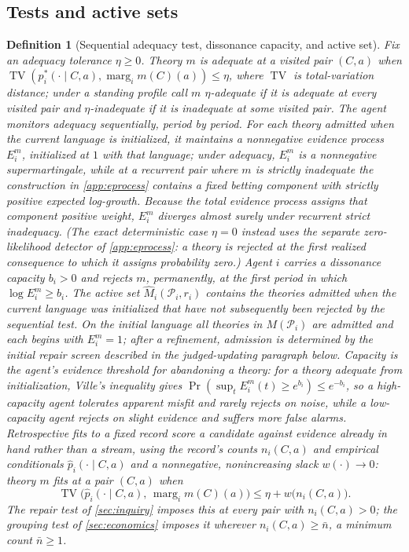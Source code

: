 \documentclass[11pt]{article}
\newtheorem{definition}[assumption]{Definition}
\theoremstyle{definition}
\newcommand{\TV}{\operatorname{TV}}
\newcommand{\marg}[1]{\operatorname{marg}_{#1}}
\begin{document}
\subsection{Tests and active sets}

\begin{definition}[Sequential adequacy test, dissonance capacity, and active set]
\label{def:test}
Fix an adequacy tolerance $\eta\ge0$.
Theory $m$ is \emph{adequate} at a visited pair $(C,a)$ when $\TV\!\left(p_i^{*}(\cdot\mid C,a),\marg{i}m(C)(a)\right)\le\eta$, where $\TV$ is total-variation distance; under a standing profile call $m$ \emph{$\eta$-adequate} if it is adequate at every visited pair and \emph{$\eta$-inadequate} if it is inadequate at some visited pair.
The agent monitors adequacy \emph{sequentially}, period by period.
For each theory admitted when the current language is initialized, it maintains a nonnegative \emph{evidence process} $E_i^{m}$, initialized at $1$ with that language; under adequacy, $E_i^{m}$ is a nonnegative supermartingale, while at a recurrent pair where $m$ is strictly inadequate the construction in \cref{app:eprocess} contains a fixed betting component with strictly positive expected log-growth.
Because the total evidence process assigns that component positive weight, $E_i^{m}$ diverges almost surely under recurrent strict inadequacy.
(The exact deterministic case $\eta=0$ instead uses the separate zero-likelihood detector of \cref{app:eprocess}: a theory is rejected at the first realized consequence to which it assigns probability zero.)
Agent $i$ carries a \emph{dissonance capacity} $b_i>0$ and \emph{rejects} $m$, permanently, at the first period in which $\log E_i^{m}\ge b_i$.
The \emph{active set} $\widehat M_i(\mathcal P_i,r_i)$ contains the theories admitted when the current language was initialized that have not subsequently been rejected by the sequential test.
On the initial language all theories in $M(\mathcal P_i)$ are admitted and each begins with $E_i^m=1$; after a refinement, admission is determined by the initial repair screen described in the judged-updating paragraph below.
Capacity is the agent's evidence threshold for abandoning a theory: for a theory adequate from initialization, Ville's inequality gives $\Pr(\sup_t E_i^m(t)\ge e^{b_i})\le e^{-b_i}$, so a high-capacity agent tolerates apparent misfit and rarely rejects on noise, while a low-capacity agent rejects on slight evidence and suffers more false alarms.
Retrospective fits to a \emph{fixed} record score a candidate against evidence already in hand rather than a stream, using the record's counts $n_i(C,a)$ and empirical conditionals $\hat p_i(\cdot\mid C,a)$ and a nonnegative, nonincreasing slack $w(\cdot)\to0$: theory $m$ \emph{fits} at a pair $(C,a)$ when
\begin{equation}
\TV\bigl(\hat p_i(\cdot\mid C,a),\,\marg{i}m(C)(a)\bigr)
\le
\eta+w\bigl(n_i(C,a)\bigr).
\label{eq:test}
\end{equation}
The repair test of \cref{sec:inquiry} imposes this at every pair with $n_i(C,a)>0$; the grouping test of \cref{sec:economics} imposes it wherever $n_i(C,a)\ge\bar n$, a minimum count $\bar n\ge1$.
\end{definition}
\end{document}
